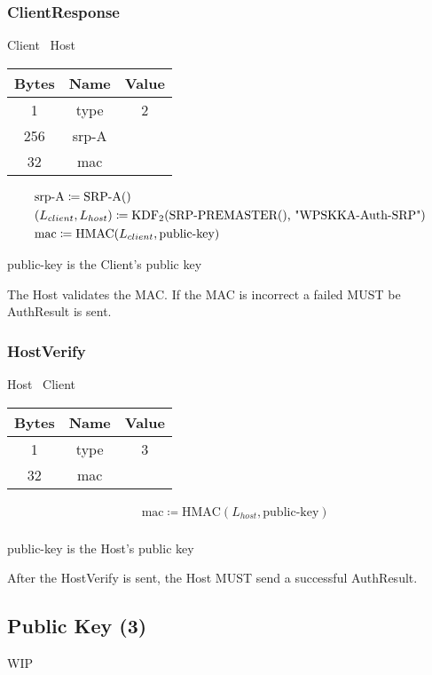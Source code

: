 \subsubsection{ClientResponse}

\begin{center}
    Client \textrightarrow\ Host\\
    \begin{tabular}{|c|c|c|}
        \hline
        \textbf{Bytes} & \textbf{Name} & \textbf{Value} \\
        \hline
        1              & type          & 2              \\
        \hline
        256            & srp-A         &                \\
        \hline
        32             & mac           &                \\
        \hline
    \end{tabular}
\end{center}

\begin{align*}
    & \text{srp-A} \coloneqq \text{SRP-A()}\\
    & (L_{client}, L_{host}) \coloneqq \text{KDF}_2\text{(SRP-PREMASTER(), \text{"WPSKKA-Auth-SRP"})}\\
    & \text{mac} \coloneqq \text{HMAC}(L_{client},\text{public-key})\\
\end{align*}

public-key is the Client's public key

The Host validates the MAC.
If the MAC is incorrect a failed MUST be AuthResult is sent.

\subsubsection{HostVerify}

\begin{center}
    Host \textrightarrow\ Client\\
    \begin{tabular}{|c|c|c|}
        \hline
        \textbf{Bytes} & \textbf{Name} & \textbf{Value} \\
        \hline
        1              & type          & 3              \\
        \hline
        32             & mac           &                \\
        \hline
    \end{tabular}
\end{center}

\begin{align*}
    & \text{mac} \coloneqq \text{HMAC}(L_{host}, \text{public-key})\\
\end{align*}

public-key is the Host's public key

After the HostVerify is sent, the Host MUST send a successful AuthResult.

\subsection{Public Key (3)}

WIP